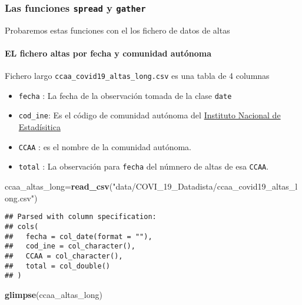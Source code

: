 \documentclass[
]{article}
\newenvironment{Shaded}{\begin{snugshade}}{\end{snugshade}}
\newcommand{\KeywordTok}[1]{\textcolor[rgb]{0.13,0.29,0.53}{\textbf{#1}}}
\newcommand{\NormalTok}[1]{#1}
\newcommand{\StringTok}[1]{\textcolor[rgb]{0.31,0.60,0.02}{#1}}
\providecommand{\tightlist}{%
  \setlength{\itemsep}{0pt}\setlength{\parskip}{0pt}}
\begin{document}
\hypertarget{las-funciones-spread-y-gather}{%
\subsubsection{\texorpdfstring{Las funciones \texttt{spread} y
\texttt{gather}}{Las funciones spread y gather}}\label{las-funciones-spread-y-gather}}

Probaremos estas funciones con el los fichero de datos de altas

\hypertarget{el-fichero-altas-por-fecha-y-comunidad-autuxf3noma}{%
\paragraph{EL fichero altas por fecha y comunidad
autónoma}\label{el-fichero-altas-por-fecha-y-comunidad-autuxf3noma}}

Fichero largo \texttt{ccaa\_covid19\_altas\_long.csv} es una tabla de 4
columnas

\begin{itemize}
\tightlist
\item
  \texttt{fecha} : La fecha de la observación tomada de la clase
  \texttt{date}
\item
  \texttt{cod\_ine}: Es el código de comunidad autónoma del
  \href{https://www.ine.es/daco/daco42/codmun/cod_ccaa.htm}{Instituto
  Nacional de Estadísitica}
\item
  \texttt{CCAA} : es el nombre de la comunidad autónoma.
\item
  \texttt{total} : La observación para \texttt{fecha} del númnero de
  altas de esa \texttt{CCAA}.
\end{itemize}

\begin{Shaded}
\begin{Highlighting}[]
\NormalTok{ccaa_altas_long=}\KeywordTok{read_csv}\NormalTok{(}\StringTok{"data/COVI_19_Datadista/ccaa_covid19_altas_long.csv"}\NormalTok{)}
\end{Highlighting}
\end{Shaded}

\begin{verbatim}
## Parsed with column specification:
## cols(
##   fecha = col_date(format = ""),
##   cod_ine = col_character(),
##   CCAA = col_character(),
##   total = col_double()
## )
\end{verbatim}

\begin{Shaded}
\begin{Highlighting}[]
\KeywordTok{glimpse}\NormalTok{(ccaa_altas_long)}
\end{Highlighting}
\end{Shaded}
\end{document}
